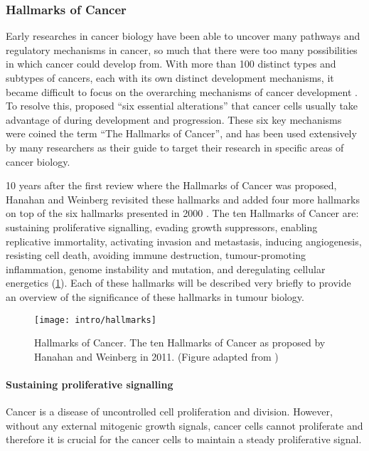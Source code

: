 \subsubsection{Hallmarks of Cancer}
\label{subsubsec:cancerhallmarks}


Early researches in cancer biology have been able to uncover many pathways and regulatory mechanisms in cancer, so much that there were too many possibilities in which cancer could develop from.
With more than 100 distinct types and subtypes of cancers, each with its own distinct development mechanisms, it became difficult to focus on the overarching mechanisms of cancer development \citep{Hanahan2000}.
To resolve this, \citet{Hanahan2000} proposed ``six essential alterations'' that cancer cells usually take advantage of during development and progression.
These six key mechanisms were coined the term ``The Hallmarks of Cancer'', and has been used extensively by many researchers as their guide to target their research in specific areas of cancer biology.

10 years after the first review where the Hallmarks of Cancer was proposed, Hanahan and Weinberg revisited these hallmarks and added four more hallmarks on top of the six hallmarks presented in 2000 \citep{Hanahan2011}.
The ten Hallmarks of Cancer are: sustaining proliferative signalling, evading growth suppressors, enabling replicative immortality, activating invasion and metastasis, inducing angiogenesis, resisting cell death, avoiding immune destruction, tumour-promoting inflammation, genome instability and mutation, and deregulating cellular energetics (\cref{fig:hallmarks}).
Each of these hallmarks will be described very briefly to provide an overview of the significance of these hallmarks in tumour biology.

\begin{figure}[h!]
	\centering
	\texttt{[image: intro/hallmarks]}
	\caption[Hallmarks of Cancer]{Hallmarks of Cancer. The ten Hallmarks of Cancer as proposed by Hanahan and Weinberg in 2011. (Figure adapted from \citet{Hanahan2011})}
	\label{fig:hallmarks}
\end{figure}

\paragraph{Sustaining proliferative signalling}

\noindent
Cancer is a disease of uncontrolled cell proliferation and division.
However, without any external mitogenic growth signals, cancer cells cannot proliferate and therefore it is crucial for the cancer cells to maintain a steady proliferative signal.

